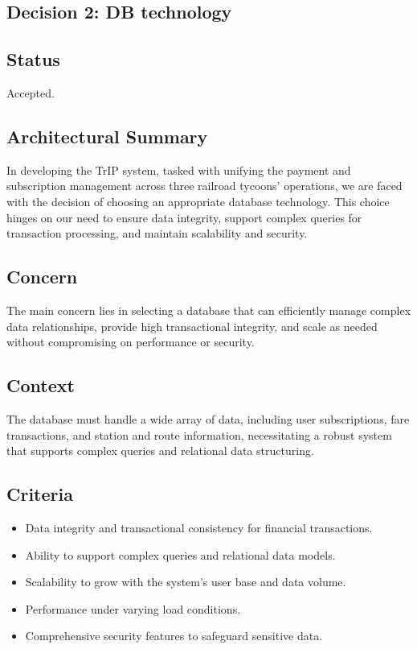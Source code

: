 \subsection{Decision 2: DB technology}

\subsection*{Status}
Accepted.

\subsection*{Architectural Summary}
In developing the TrIP system, tasked with unifying the payment and subscription management across three railroad tycoons' operations, we are faced with the decision of choosing an appropriate database technology. This choice hinges on our need to ensure data integrity, support complex queries for transaction processing, and maintain scalability and security.

\subsection*{Concern}
The main concern lies in selecting a database that can efficiently manage complex data relationships, provide high transactional integrity, and scale as needed without compromising on performance or security.

\subsection*{Context}
The database must handle a wide array of data, including user subscriptions, fare transactions, and station and route information, necessitating a robust system that supports complex queries and relational data structuring.

\subsection*{Criteria}
\begin{itemize}
    \item Data integrity and transactional consistency for financial transactions.
    \item Ability to support complex queries and relational data models.
    \item Scalability to grow with the system's user base and data volume.
    \item Performance under varying load conditions.
    \item Comprehensive security features to safeguard sensitive data.
\end{itemize}

